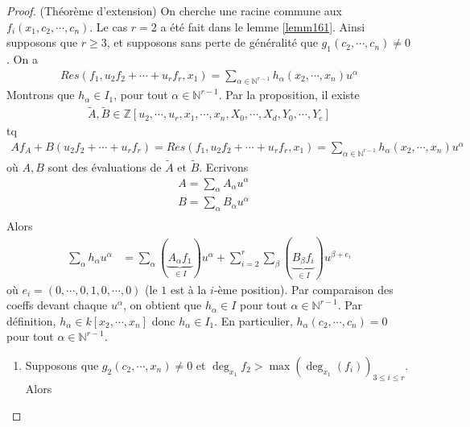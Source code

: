            \begin{proof} (Théorème d'extension)
                On cherche une racine commune aux $f_i(x_1, c_2, \cdots, c_n)$. Le cas $r = 2$ a été fait dans le lemme \ref{lemm161}. Ainsi supposons que $r \geq 3$, et supposons sans perte de généralité que $g_1(c_2, \cdots, c_n) \neq 0$. On a
                \begin{align*}
                    Res(f_1, u_2f_2 + \cdots + u_rf_r, x_1) = \sum_{\alpha \in \mathbb{N}^{r-1}} h_\alpha(x_2, \cdots, x_n) u^\alpha 
                \end{align*}
                Montrons que $h_{\alpha} \in I_1$, pour tout $\alpha \in \mathbb{N}^{r-1}$. Par la proposition, il existe
                \begin{align*}
                    \tilde A, \tilde B \in \mathbb{Z}[u_2, \cdots, u_r, x_1, \cdots, x_n, X_0, \cdots, X_d, Y_0, \cdots, Y_e]
                \end{align*}
                tq 
                \begin{align*}
                    Af_A + B(u_2f_2 + \cdots + u_rf_r) = Res(f_1, u_2f_2 + \cdots + u_rf_r, x_1)
                    = \sum_{\alpha \in \mathbb{N}^{r-1}} h_\alpha(x_2, \cdots, x_n) u^\alpha 
                \end{align*}
                où $A,B$ sont des évaluations de $\tilde A$ et $\tilde B$. Ecrivons
                \begin{align*}
                    &A = \sum_{\alpha} A_\alpha u^\alpha \\
                    &B = \sum_{\alpha} B_\alpha u^\alpha \\
                \end{align*}
                Alors
                \begin{align*}
                    \sum_\alpha h_\alpha u^\alpha &= \sum_\alpha (\underbrace{A_\alpha f_1}_{\in I}) u^\alpha + \sum_{i = 2}^r \sum_\beta (\underbrace{B_\beta f_i}_{\in I}) u^{\beta + e_i} 
                \end{align*}
                où $e_i = (0, \cdots, 0, 1, 0, \cdots, 0)$ (le $1$ est à la $i$-ème position). Par comparaison des coeffs devant chaque $u^\alpha$, on obtient que $h_\alpha \in I$ pour tout $\alpha \in \mathbb{N}^{r-1}$. Par définition, $h_\alpha \in k[x_2, \cdots, x_n]$ donc $h_\alpha \in I_1$. En particulier, $h_\alpha(c_2, \cdots, c_n) = 0$ pour tout $\alpha \in \mathbb{N}^{r-1}$.
                \begin{enumerate}
                    \item Supposons que $g_2(c_2, \cdots, x_n) \neq 0$ et $\deg_{x_1} f_2 > \max(\deg_{x_1}(f_i))_{3 \leq i \leq r}$. Alors

\end{enumerate}
\end{proof}
